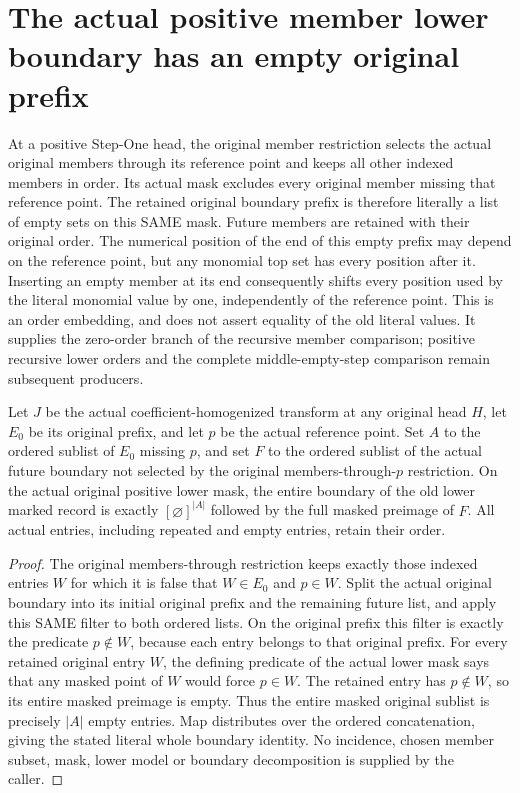 \section{The actual positive member lower boundary has an empty original prefix}
At a positive Step-One head, the original member restriction selects the actual original members through its reference point and keeps all other indexed members in order. Its actual mask excludes every original member missing that reference point. The retained original boundary prefix is therefore literally a list of empty sets on this SAME mask. Future members are retained with their original order. The numerical position of the end of this empty prefix may depend on the reference point, but any monomial top set has every position after it. Inserting an empty member at its end consequently shifts every position used by the literal monomial value by one, independently of the reference point. This is an order embedding, and does not assert equality of the old literal values. It supplies the zero-order branch of the recursive member comparison; positive recursive lower orders and the complete middle-empty-step comparison remain subsequent producers.

\begin{lemma}
\label{hir:member-future-boundary}
\leanok
Let $J$ be the actual coefficient-homogenized transform at any original head $H$, let $E_0$ be its original prefix, and let $p$ be the actual reference point. Set $A$ to the ordered sublist of $E_0$ missing $p$, and set $F$ to the ordered sublist of the actual future boundary not selected by the original members-through-$p$ restriction. On the actual original positive lower mask, the entire boundary of the old lower marked record is exactly $[\varnothing]^{|A|}$ followed by the full masked preimage of $F$. All actual entries, including repeated and empty entries, retain their order.
\end{lemma}
\begin{proof}
The original members-through restriction keeps exactly those indexed entries $W$ for which it is false that $W\in E_0$ and $p\in W$. Split the actual original boundary into its initial original prefix and the remaining future list, and apply this SAME filter to both ordered lists. On the original prefix this filter is exactly the predicate $p\notin W$, because each entry belongs to that original prefix. For every retained original entry $W$, the defining predicate of the actual lower mask says that any masked point of $W$ would force $p\in W$. The retained entry has $p\notin W$, so its entire masked preimage is empty. Thus the entire masked original sublist is precisely $|A|$ empty entries. Map distributes over the ordered concatenation, giving the stated literal whole boundary identity. No incidence, chosen member subset, mask, lower model or boundary decomposition is supplied by the caller.
\end{proof}

